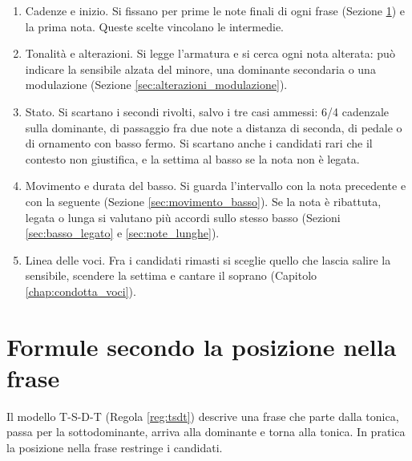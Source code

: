 \begin{regola}
	\label{reg:filtri_scelta}
	\begin{enumerate}
		\item Cadenze e inizio. Si fissano per prime le note finali di ogni frase (Sezione \ref{sec:formule_frase}) e la prima nota. Queste scelte vincolano le intermedie.
		\item Tonalità e alterazioni. Si legge l'armatura e si cerca ogni nota alterata: può indicare la sensibile alzata del minore, una dominante secondaria o una modulazione (Sezione \ref{sec:alterazioni_modulazione}).
		\item Stato. Si scartano i secondi rivolti, salvo i tre casi ammessi: 6/4 cadenzale sulla dominante, di passaggio fra due note a distanza di seconda, di pedale o di ornamento con basso fermo. Si scartano anche i candidati rari che il contesto non giustifica, e la settima al basso se la nota non è legata.
		\item Movimento e durata del basso. Si guarda l'intervallo con la nota precedente e con la seguente (Sezione \ref{sec:movimento_basso}). Se la nota è ribattuta, legata o lunga si valutano più accordi sullo stesso basso (Sezioni \ref{sec:basso_legato} e \ref{sec:note_lunghe}).
		\item Linea delle voci. Fra i candidati rimasti si sceglie quello che lascia salire la sensibile, scendere la settima e cantare il soprano (Capitolo \ref{chap:condotta_voci}).
	\end{enumerate}
\end{regola}

\section{Formule secondo la posizione nella frase}
\label{sec:formule_frase}

Il modello T-S-D-T (Regola \ref{reg:tsdt}) descrive una frase che parte dalla tonica, passa per la sottodominante, arriva alla dominante e torna alla tonica. In pratica la posizione nella frase restringe i candidati.

